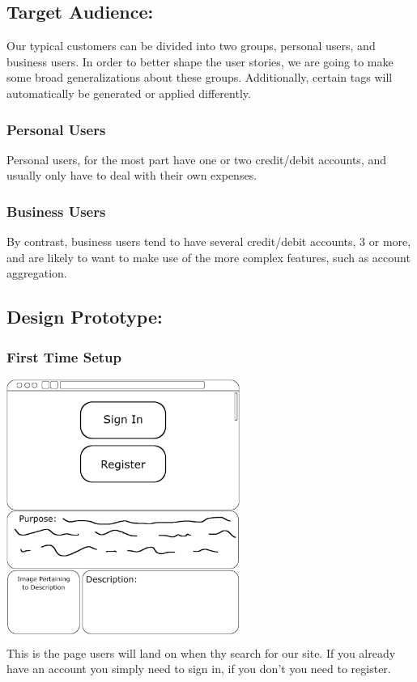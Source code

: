 \documentclass[12pt]{article}
\begin{document}
\subsection{Target Audience:}
Our typical customers can be divided into two groups, personal users, and business users. In order to better shape the user stories, we are going to make some broad generalizations about these groups. Additionally, certain tags will automatically be generated or applied differently.\\
\subsubsection{Personal Users}
Personal users, for the most part have one or two credit/debit accounts, and usually only have to deal with their own expenses.\\
\subsubsection{Business Users}
By contrast, business users tend to have several credit/debit accounts, 3 or more, and are likely to want to make use of the more complex features, such as account aggregation.\\
\subsection{Design Prototype:}
\subsubsection{First Time Setup}
\includegraphics[width=3in]{HomePage.png}\\
This is the page users will land on when thy search for our site. If you already have an account you simply need to sign in, if you don't you need to register.\\
\end{document}
